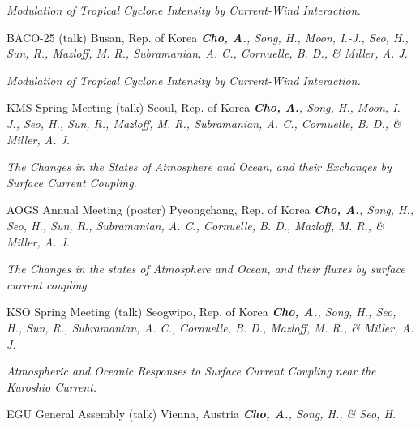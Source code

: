 \documentclass[11pt,usletter,sans]{moderncv}
\begin{document}
\vspace{0.5em}

        {\parbox[t]{0.8\textwidth}{\textit{Modulation of Tropical Cyclone Intensity by Current-Wind Interaction.}}}
        {BACO-25 (talk)}   %
        {Busan, Rep. of Korea}           %
        {}
        {}
        {\emph{\textbf{Cho, A.}, Song, H., Moon, I.-J., Seo, H., Sun, R., Mazloff, M. R., 
Subramanian, A. C., Cornuelle, B. D., \& Miller, A. J.}}
        
\vspace{0.5em}

        {\parbox[t]{0.8\textwidth}{\textit{Modulation of Tropical Cyclone Intensity by Current-Wind Interaction.}}}
        {KMS Spring Meeting (talk)}   %
        {Seoul, Rep. of Korea}           %
        {}
        {}
        {\emph{\textbf{Cho, A.}, Song, H., Moon, I.-J., Seo, H., Sun, R., Mazloff, M. R., 
Subramanian, A. C., Cornuelle, B. D., \& Miller, A. J.}}
        
\vspace{0.5em}

        {\parbox[t]{0.7\textwidth}{\textit{The Changes in the States of Atmosphere and Ocean, and their Exchanges by Surface Current Coupling.}}}
        {AOGS Annual Meeting (poster)}   %
        {Pyeongchang, Rep. of Korea}           %
        {}
        {}
        {\emph{\textbf{Cho, A.}, Song, H., Seo, H., Sun, R., Subramanian, A. C., Cornuelle, B. D., Mazloff, M. R., 
 \& Miller, A. J.}}
        
\vspace{0.5em}

        {\parbox[t]{0.7\textwidth}{\textit{The Changes in the states of Atmosphere and Ocean, and their fluxes by surface current coupling}}}
        {KSO Spring Meeting (talk)}   %
        {Seogwipo, Rep. of Korea}           %
        {}
        {}
        {\emph{\textbf{Cho, A.}, Song, H., Seo, H., Sun, R., Subramanian, A. C., Cornuelle, B. D., Mazloff, M. R., 
 \& Miller, A. J.}}
        
\vspace{0.5em}

        {\parbox[t]{0.8\textwidth}{\textit{Atmospheric and Oceanic Responses to Surface Current Coupling near the Kuroshio Current.}}}
        {EGU General Assembly (talk)}   %
        {Vienna, Austria}           %
        {}
        {}
        {\emph{\textbf{Cho, A.}, Song, H., \& Seo, H.}}
        
\end{document}
